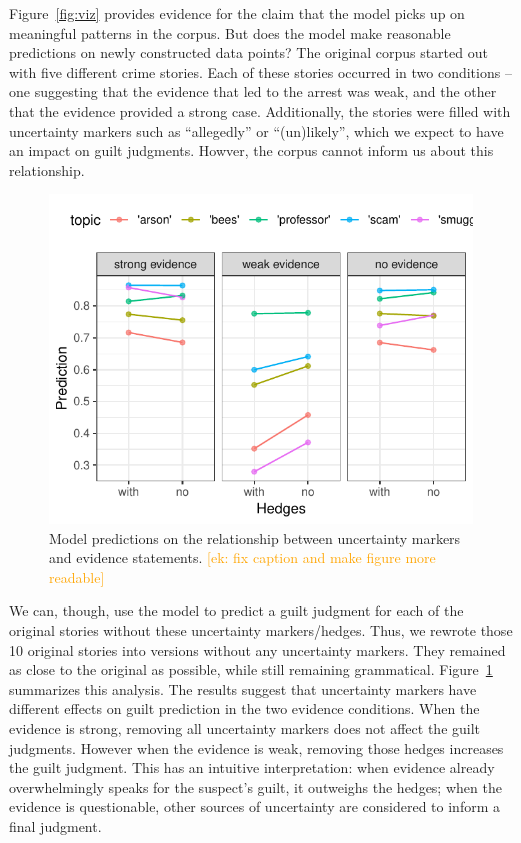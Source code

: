 \documentclass[11pt,a4paper]{article}
\newcommand{\ek}[1]{\textcolor{Orange}{[ek: #1]}}
\begin{document}
Figure~\ref{fig:viz} provides evidence for the claim that the model picks up on meaningful patterns in the corpus. But does the model make reasonable predictions on newly constructed data points?  The original corpus started out with five different crime stories. Each of these stories occurred in two conditions -- one suggesting that the evidence that led to the arrest was weak, and the other that the evidence provided a strong case. Additionally, the stories were filled with uncertainty markers such as ``allegedly'' or ``(un)likely'', which we expect to have an impact on guilt judgments. Howver, the corpus cannot inform us about this relationship.

\begin{figure}
	\includegraphics[width=1\linewidth]{graphs/hedges.pdf}
	\caption{Model predictions on the relationship between uncertainty markers and evidence statements. \ek{fix caption and make figure more readable}}
	\label{fig:hedges}
\end{figure}


We can, though, use the model to predict a guilt judgment for each of the original stories without these uncertainty markers/hedges. Thus, we rewrote those 10 original stories into versions without any uncertainty markers. They remained as close to the original as possible, while still remaining grammatical.
Figure~\ref{fig:hedges} summarizes this analysis. The results suggest that uncertainty markers have different effects on guilt prediction in the two evidence conditions. When the evidence is strong, removing all uncertainty markers does not affect the guilt judgments. However when the evidence is weak, removing those hedges increases the guilt judgment. This has an intuitive interpretation: when evidence already overwhelmingly speaks for the suspect's guilt, it outweighs the hedges; when  the evidence is questionable, other sources of uncertainty are considered to inform a final judgment.
\end{document}

